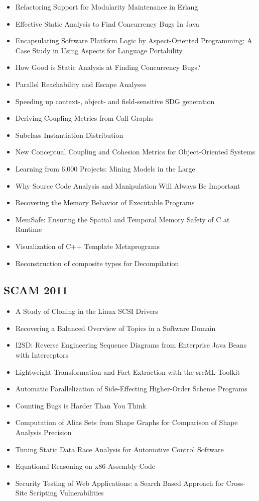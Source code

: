 {\small
\begin{itemize}[itemsep=-1ex]
  \item Refactoring Support for Modularity Maintenance in Erlang
  \item Effective Static Analysis to Find Concurrency Bugs In Java
  \item Encapsulating Software Platform Logic by Aspect-Oriented Programming: A Case Study in Using Aspects for Language Portability
  \item How Good is Static Analysis at Finding Concurrency Bugs?
  \item Parallel Reachability and Escape Analyses
  \item Speeding up context-, object- and field-sensitive SDG generation
  \item Deriving Coupling Metrics from Call Graphs
  \item Subclass Instantiation Distribution
  \item New Conceptual Coupling and Cohesion Metrics for Object-Oriented Systems
  \item Learning from 6,000 Projects: Mining Models in the Large
  \item Why Source Code Analysis and Manipulation Will Always Be Important
  \item Recovering the Memory Behavior of Executable Programs
  \item MemSafe: Ensuring the Spatial and Temporal Memory Safety of C at Runtime
  \item Visualization of C++ Template Metaprograms
  \item Reconstruction of composite types for Decompilation
\end{itemize}
}

\subsection{SCAM 2011}

{\small
\begin{itemize}[itemsep=-1ex]
  \item A Study of Cloning in the Linux SCSI Drivers
  \item Recovering a Balanced Overview of Topics in a Software Domain
  \item I2SD: Reverse Engineering Sequence Diagrams from Enterprise Java Beans with Interceptors
  \item Lightweight Transformation and Fact Extraction with the srcML Toolkit
  \item Automatic Parallelization of Side-Effecting Higher-Order Scheme Programs
  \item Counting Bugs is Harder Than You Think
  \item Computation of Alias Sets from Shape Graphs for Comparison of Shape Analysis Precision
  \item Tuning Static Data Race Analysis for Automotive Control Software
  \item Equational Reasoning on x86 Assembly Code
  \item Security Testing of Web Applications: a Search Based Approach for Cross-Site Scripting Vulnerabilities
\end{itemize}
}

